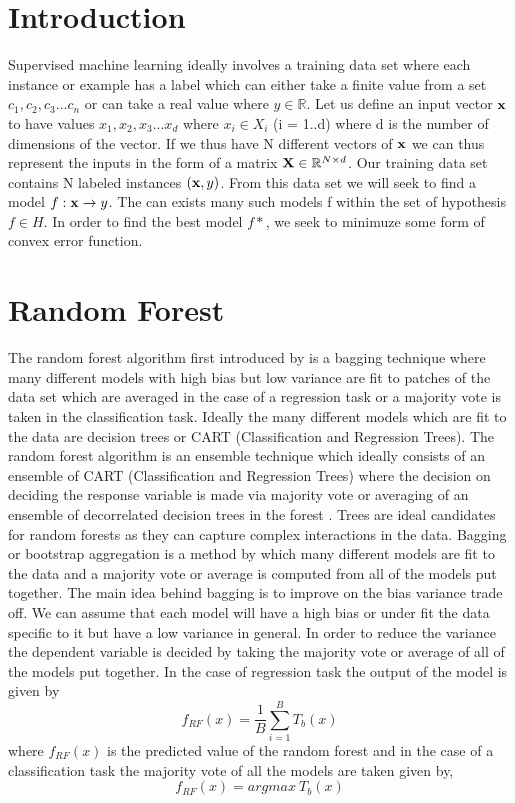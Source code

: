 \documentclass[proposal]{umassthesis}
\begin{document}
\section{Introduction}
Supervised machine learning ideally involves a training data set where each instance or example has a label which can either take a finite value from a set ${c_1,c_2,c_3...c_n}$ or can take a real value where $y \in \mathbb{R}$. Let us define an input vector $\bold{x}$ to have values $x_1,x_2,x_3...x_d$ where $x_i \in X_i$ (i = 1..d) where d is the number of dimensions of the vector. If we thus have N different vectors of $\bold{x}$ we can thus represent the inputs in the form of a matrix $\bold{X} \in \mathbb{R}^{N \times d}$. Our training data set contains N labeled instances $(\bold{x},y)$. From this data set we will seek to find a model $f: \bold{x} \rightarrow y$. The can exists many such models f within the set of hypothesis $f \in H$. In order to find the best model $f*$, we seek to minimuze some form of convex error function. 
\section{Random Forest}
The random forest algorithm first introduced by \cite{breiman2001random} is a bagging technique where many different models with high bias but low variance are fit to patches of the data set which are averaged in the case of a regression task or a majority vote is taken in the classification task. Ideally the many different models which are fit to the data are decision trees or CART (Classification and Regression Trees). 
The random forest algorithm is an ensemble technique which ideally consists of an ensemble of CART (Classification and Regression Trees) where the decision on deciding the response variable is made via majority vote or averaging of an ensemble of decorrelated decision trees in the forest \cite{breiman2001random}. Trees are ideal candidates for random forests as they can capture complex interactions in the data. Bagging or bootstrap aggregation is a method by which many different models are fit to the data and a majority vote or average is computed from all of the models put together. The main idea behind bagging is to improve on the bias variance trade off. We can assume that each model will have a high bias or under fit the data specific to it but have a low variance in general. In order to reduce the variance the dependent variable is decided by taking the majority vote or average of all of the models put together. In the case of regression task the output of the model is given by 
\begin{equation}
f_{RF}(x) = \dfrac{1}{B} \sum_{i = 1}^{B} T_b(x)
\end{equation}
where $f_{RF}(x)$ is the predicted value of the random forest and in the case of a classification task the majority vote of all the models are taken given by,
\begin{equation}
f_{RF}(x) = arg max \ T_b(x)
\end{equation}
\end{document}
